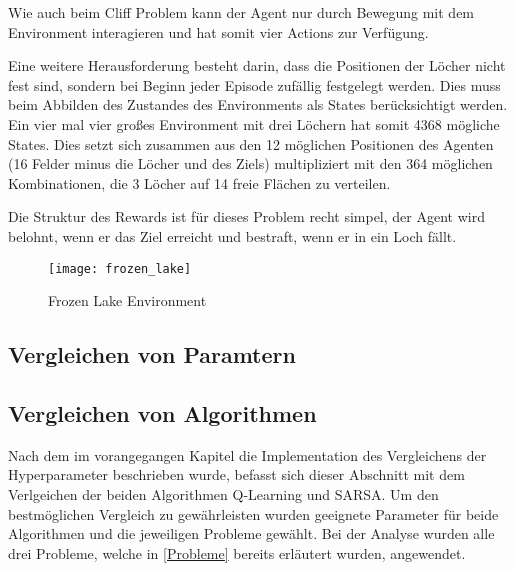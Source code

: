 \begin{enumerate}
    Wie auch beim Cliff Problem kann der Agent nur durch Bewegung mit dem Environment interagieren und hat somit vier Actions zur Verfügung.

    Eine weitere Herausforderung besteht darin, dass die Positionen der Löcher nicht fest sind, sondern bei Beginn jeder Episode zufällig festgelegt werden. Dies muss beim Abbilden des Zustandes des Environments als States berücksichtigt werden. Ein vier mal vier großes Environment mit drei Löchern hat somit 4368 mögliche States. Dies setzt sich zusammen aus den 12 möglichen Positionen des Agenten (16 Felder minus die Löcher und des Ziels) multipliziert mit den 364 möglichen Kombinationen, die 3 Löcher auf 14 freie Flächen zu verteilen.

    Die Struktur des Rewards ist für dieses Problem recht simpel, der Agent wird belohnt, wenn er das Ziel erreicht und bestraft, wenn er in ein Loch fällt.
    
    \begin{figure}
        \centering
        \texttt{[image: frozen\_lake]}
        \caption{Frozen Lake Environment}
        \label{fig:frozen_env}
    \end{figure}


\end{enumerate}

\subsection{Vergleichen von Paramtern}

\subsection{Vergleichen von Algorithmen}

Nach dem im vorangegangen Kapitel die Implementation des Vergleichens der Hyperparameter beschrieben wurde, befasst sich dieser Abschnitt mit dem Verlgeichen der beiden Algorithmen Q-Learning und SARSA. 
Um den bestmöglichen Vergleich zu gewährleisten wurden geeignete Parameter für beide Algorithmen und die jeweiligen Probleme gewählt. Bei der Analyse wurden alle drei Probleme, welche in \ref{Probleme} bereits erläutert wurden, angewendet.



